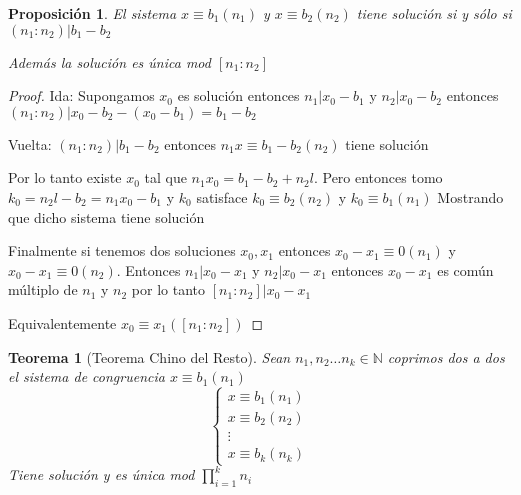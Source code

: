 \documentclass{article}
\theoremstyle{break}
\newtheorem{theorem}{Teorema}[section]
\newtheorem{proposition}{Proposición}
\def \N{\mathbb{N}}
\begin{document}
        \begin{proposition}
            El sistema $x\equiv b_1 (n_1)$ y $x\equiv b_2 (n_2)$ tiene solución si y sólo si $(n_1:n_2)|b_1 -b_2$

            Además la solución es única mod $[n_1:n_2]$
        \end{proposition}
        \begin{proof}
            Ida: Supongamos $x_0$ es solución entonces $n_1 | x_0 - b_1$ y $n_2 |x_0 -b_2$ entonces 
            $(n_1:n_2)|x_0-b_2 - (x_0 -b_1) = b_1 - b_2$

            Vuelta: $(n_1:n_2) |b_1-b_2$ entonces $n_1x \equiv b_1-b_2 (n_2)$ tiene solución
            
            Por lo tanto existe $x_0$ tal que $n_1x_0 = b_1-b_2 + n_2l$. Pero entonces tomo 
            $k_0 = n_2l -b_2 =n_1x_0 -b_1 $ y $k_0$ satisface $k_0 \equiv b_2 (n_2)$ y $k_0\equiv b_1(n_1)$
            Mostrando que dicho sistema tiene solución

            Finalmente si tenemos dos soluciones $x_0,x_1$ entonces $x_0 - x_1 \equiv 0 (n_1)$
            y $x_0 - x_1 \equiv 0 (n_2)$. Entonces $n_1|x_0-x_1$ y $n_2|x_0-x_1$ entonces $x_0-x_1$
            es común múltiplo de $n_1$ y $n_2$ por lo tanto $[n_1:n_2]|x_0-x_1$ 
            
            Equivalentemente
            $x_0\equiv x_1 ([n_1:n_2])$
        \end{proof}

        \begin{theorem}[Teorema Chino del Resto]
            Sean $n_1,n_2\ldots n_k \in \N$ coprimos dos a dos el sistema de congruencia $x\equiv b_1(n_1)$
            \[ 
                \begin{cases} 
                x\equiv b_1 (n_1) \\
                x\equiv b_2 (n_2) \\
                 \vdots \\
                x\equiv b_k (n_k)
                \end{cases}
            \]
                Tiene solución y es única mod $\prod_{i=1}^k n_i$
        \end{theorem}
\end{document}
